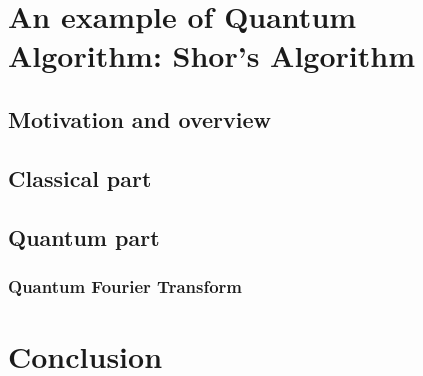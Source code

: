 \documentclass[12pt,a4paper]{article}
\begin{document}
\section{An example of Quantum Algorithm: Shor's Algorithm}
\subsection{Motivation and overview}
\subsection{Classical part}
\subsection{Quantum part}
\subsubsection{Quantum Fourier Transform}

\section*{Conclusion}
\end{document}
